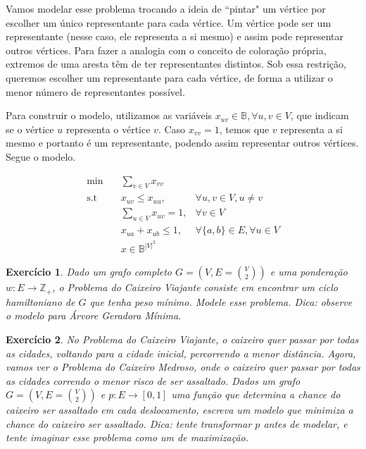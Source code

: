 \documentclass[]{article}
\newtheorem{exercicio}{Exercício}
\numberwithin{equation}{section}
\begin{document}
Vamos modelar esse problema trocando a ideia de ``pintar" um vértice por escolher um único
representante para cada vértice.
Um vértice pode ser um representante (nesse caso, ele representa a si mesmo) e assim pode representar
outros vértices.
Para fazer a analogia com o conceito de coloração própria, extremos de uma aresta têm de ter
representantes distintos.
Sob essa restrição, queremos escolher um representante para cada vértice, de forma a utilizar o menor
número de representantes possível.

Para construir o modelo, utilizamos as variáveis $x_{uv} \in \mathbb{B}, \forall u, v \in V$, que
indicam se o vértice $u$ representa o vértice $v$.
Caso $x_{vv} = 1$, temos que $v$ representa a si mesmo e portanto é um representante, podendo assim
representar outros vértices. Segue o modelo.

\begin{align}
\min        &\quad  \sum_{v \in V} x_{vv} \\
\text{s.t}  &\quad  x_{uv} \leq x_{uu}, & \forall u, v \in V, u \neq v \\
            &\quad  \sum_{u \in V} x_{uv} = 1, & \forall v \in V \\
            &\quad  x_{ua} + x_{ub} \leq 1, & \forall \{a, b\} \in E, \forall u \in V \\
            &\quad  x \in \mathbb{B}^{|V|^2}
\end{align}

\begin{exercicio}
  Dado um grafo completo $G = (V, E = \binom{V}{2})$ e uma ponderação $w : E \to \mathbb{Z}_+$, o
  Problema do Caixeiro Viajante consiste em encontrar um ciclo hamiltoniano de $G$ que tenha peso
  mínimo.
  Modele esse problema.
  Dica: observe o modelo para Árvore Geradora Mínima.
\end{exercicio}

\begin{exercicio}
  No Problema do Caixeiro Viajante, o caixeiro quer passar por todas as cidades, voltando para a cidade
  inicial, percorrendo a menor distância.
  Agora, vamos ver o Problema do Caixeiro Medroso, onde o caixeiro quer passar por todas as cidades
  correndo o menor risco de ser assaltado.
  Dados um grafo $G = (V, E = \binom{V}{2})$ e $p: E \to [0, 1]$ uma função que determina a chance do
  caixeiro ser assaltado em cada deslocamento, escreva um modelo que minimiza a chance do caixeiro ser
  assaltado.
  Dica: tente transformar $p$ antes de modelar, e tente imaginar esse problema como um de maximização.
\end{exercicio}
\end{document}
